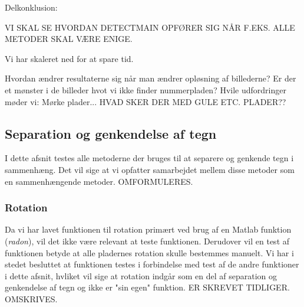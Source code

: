 \begin{comment} %
\subsubsection*{Observeret sæt på 407 billeder}
Scale: 0.25
DetectMain: 96.6/99.24
DetectQuant: 67.8/75.4
DetectSameness: 56.8/95.5
DetectContrastAvg: 62.7/85.0
DetectPlateness: 50.4/65.5
DetectCStretch: 84.0/92.7

Scale: 0.50 (Ekstremt langsomt)
DetectPlateness: 29.7/56.5
DetectCStretch:
\end{comment}


Delkonklusion:

VI SKAL SE HVORDAN DETECTMAIN OPFØRER SIG NÅR F.EKS. ALLE METODER SKAL VÆRE ENIGE.

Vi har skaleret ned for at spare tid.

Hvordan ændrer resultaterne sig når man ændrer opløsning af billederne?
Er der et mønster i de billeder hvot vi ikke finder nummerpladen? Hvile udfordringer møder vi: Mørke plader... 
HVAD SKER DER MED GULE ETC. PLADER??



\subsection{Separation og genkendelse af tegn}


I dette afsnit testes alle metoderne der bruges til at separere og genkende tegn i sammenhæng. Det vil sige at vi opfatter samarbejdet mellem disse metoder som en sammenhængende metoder. OMFORMULERES.

\subsubsection{Rotation}

Da vi har lavet funktionen til rotation primært ved brug af en Matlab funktion (\textit{radon}), vil det ikke være relevant at teste funktionen. Derudover vil en test af funktionen betyde at alle pladernes rotation skulle bestemmes manuelt. Vi har i stedet besluttet at funktionen testes i forbindelse med test af de andre funktioner i dette afsnit, hvliket vil sige at rotation indgår som en del af separation og genkendelse af tegn og ikke er "sin egen" funktion. ER SKREVET TIDLIGER. OMSKRIVES.

